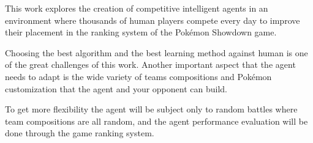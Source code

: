 \begin{resumoingles}
This work explores the creation of competitive intelligent agents in an environment where thousands of human players compete every day to improve their placement in the ranking system of the Pok\'{e}mon Showdown game.

Choosing the best algorithm and the best learning method against human is one of the great challenges of this work. Another important aspect that the agent needs to adapt is the wide variety of teams compositions and Pok\'{e}mon customization that the agent and your opponent can build.

To get more flexibility the agent will be subject only to random battles where team compositions are all random, and the agent performance evaluation will be done through the game ranking system.
\end{resumoingles}